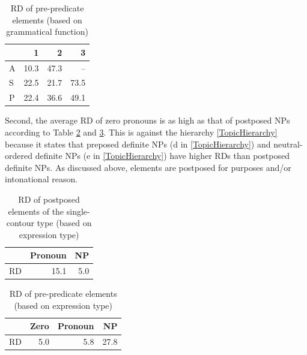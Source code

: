 \begin{table}
\centering
\caption{RD of pre-predicate elements (based on grammatical function)}
\label{RDASP}
\begin{tabular}{lrrr}
\toprule
		& 1	& 2	& 3 \\
\midrule
	A	& 10.3	& 47.3	& -- \\
	S	& 22.5	& 21.7	& 73.5 \\
	P	& 22.4	& 36.6	& 49.1 \\
\bottomrule
\end{tabular}
\end{table}

Second,
the average RD of zero pronouns is as high as that of postposed NPs
according to Table \ref{RDPostExpTypeT} and \ref{RDPreExpTypeT}.
This is against the  hierarchy \ref{TopicHierarchy}
because it states that
preposed definite NPs (d in \ref{TopicHierarchy}) and neutral-ordered definite NPs (e in \ref{TopicHierarchy}) have
higher RDs than
postposed definite NPs.
As discussed above,
elements are postposed for  purposes and/or intonational reason.


\begin{table}
\centering
\caption{RD of postposed elements of the single-contour type (based on expression type)}
\begin{tabular}{lrr}
\toprule
  & Pronoun & NP \\
\midrule
RD & 15.1 & 5.0 \\
\bottomrule
\end{tabular}
\label{RDPostExpTypeT}
\end{table}
\begin{table}
\centering
\caption{RD of pre-predicate elements (based on expression type)}
\begin{tabular}{lrrr}
\toprule
     & Zero & Pronoun & NP \\
\midrule
 RD  & 5.0  & 5.8     & 27.8 \\
\bottomrule
\end{tabular}
\label{RDPreExpTypeT}
\end{table}

